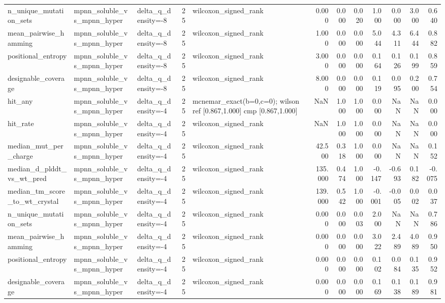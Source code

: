\begin{table}
{\begin{tabular}{lllrlrrrrrrr}
n\_unique\_mutation\_sets & mpnn\_soluble\_vs\_mpnn\_hyper & delta\_q\_density=-8 & 25 & wilcoxon\_signed\_rank & 0.000 & 0.000 & 0.020 & 1.000 & 0.000 & 3.000 & 0.640 \\
mean\_pairwise\_hamming & mpnn\_soluble\_vs\_mpnn\_hyper & delta\_q\_density=-8 & 25 & wilcoxon\_signed\_rank & 1.000 & 0.000 & 0.000 & 5.044 & 4.311 & 6.444 & 0.882 \\
positional\_entropy & mpnn\_soluble\_vs\_mpnn\_hyper & delta\_q\_density=-8 & 25 & wilcoxon\_signed\_rank & 3.000 & 0.000 & 0.000 & 0.164 & 0.126 & 0.199 & 0.859 \\
designable\_coverage & mpnn\_soluble\_vs\_mpnn\_hyper & delta\_q\_density=-8 & 25 & wilcoxon\_signed\_rank & 8.000 & 0.000 & 0.000 & 0.119 & 0.095 & 0.200 & 0.754 \\
hit\_any & mpnn\_soluble\_vs\_mpnn\_hyper & delta\_q\_density=-4 & 25 & mcnemar\_exact(b=0,c=0); wilson ref [0.867,1.000] cmp [0.867,1.000] & NaN & 1.000 & 1.000 & 0.000 & NaN & NaN & 0.000 \\
hit\_rate & mpnn\_soluble\_vs\_mpnn\_hyper & delta\_q\_density=-4 & 25 & wilcoxon\_signed\_rank & NaN & 1.000 & 1.000 & 0.000 & NaN & NaN & 0.000 \\
median\_mut\_per\_charge & mpnn\_soluble\_vs\_mpnn\_hyper & delta\_q\_density=-4 & 25 & wilcoxon\_signed\_rank & 42.500 & 0.318 & 1.000 & 0.000 & NaN & NaN & 0.152 \\
median\_d\_plddt\_vs\_wt\_pred & mpnn\_soluble\_vs\_mpnn\_hyper & delta\_q\_density=-4 & 25 & wilcoxon\_signed\_rank & 135.000 & 0.474 & 1.000 & -0.147 & -0.693 & 0.182 & -0.075 \\
median\_tm\_score\_to\_wt\_crystal & mpnn\_soluble\_vs\_mpnn\_hyper & delta\_q\_density=-4 & 25 & wilcoxon\_signed\_rank & 139.000 & 0.542 & 1.000 & -0.001 & -0.005 & 0.002 & 0.037 \\
n\_unique\_mutation\_sets & mpnn\_soluble\_vs\_mpnn\_hyper & delta\_q\_density=-4 & 25 & wilcoxon\_signed\_rank & 0.000 & 0.000 & 0.003 & 2.000 & NaN & NaN & 0.786 \\
mean\_pairwise\_hamming & mpnn\_soluble\_vs\_mpnn\_hyper & delta\_q\_density=-4 & 25 & wilcoxon\_signed\_rank & 0.000 & 0.000 & 0.000 & 3.022 & 2.489 & 4.089 & 0.950 \\
positional\_entropy & mpnn\_soluble\_vs\_mpnn\_hyper & delta\_q\_density=-4 & 25 & wilcoxon\_signed\_rank & 0.000 & 0.000 & 0.000 & 0.102 & 0.084 & 0.135 & 0.952 \\
designable\_coverage & mpnn\_soluble\_vs\_mpnn\_hyper & delta\_q\_density=-4 & 25 & wilcoxon\_signed\_rank & 0.000 & 0.000 & 0.000 & 0.169 & 0.138 & 0.189 & 0.981 \\

\end{tabular}}
\end{table}
